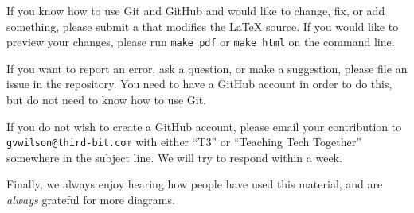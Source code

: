 \noindent
If you know how to use Git and GitHub and would like to change, fix, or add something,
please submit a  that modifies the LaTeX source.
If you would like to preview your changes,
please run \texttt{make~pdf} or \texttt{make~html} on the command line.

If you want to report an error,
ask a question,
or make a suggestion,
please file an issue in the repository.
You need to have a GitHub account in order to do this,
but do not need to know how to use Git.

If you do not wish to create a GitHub account,
please email your contribution to \texttt{gvwilson@third-bit.com}
with either ``T3'' or ``Teaching Tech Together'' somewhere in the subject line.
We will try to respond within a week.

Finally,
we always enjoy hearing how people have used this material,
and are \emph{always} grateful for more diagrams.
